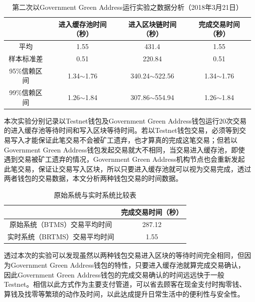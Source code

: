 			\begin{table}[!htbp]
				\centering
				\caption{第二次以Government Green Address运行实验之数据分析（2018年3月21日）}
				\label{2green-1}
				\begin{tabular}{|c|c|c|c|}
				\hline
				         & 进入缓存池时间（秒）     & 进入区块链时间（秒）         & 完成交易时间（秒）      \\ \hline
				平均       & 1.55           & 431.4              & 1.55           \\ \hline
				样本标准差    & 0.51           & 220.84             & 0.51           \\ \hline
				95\%信赖区间 & 1.34$\sim$1.76 & 340.24$\sim$522.56 & 1.34$\sim$1.76 \\ \hline
				99\%信赖区间 & 1.26$\sim$1.84 & 307.86$\sim$554.94 & 1.26$\sim$1.84 \\ \hline
				\end{tabular}
				\end{table}

				

				
				



	本次实验分别记录以Testnet钱包及Government Green Address钱包运行20次交易的进入缓存池等待时间和写入区块等待时间。若以Testnet钱包交易，必须等到交易写入才能保证此笔交易不会被矿工遗弃，也才算真的完成这笔交易；但若以Government Green Address钱包发起交易就大不相同，当交易进入缓存池，即使遇到交易被矿工遗弃的情况，Government Green Address机构节点也会重新发起此笔交易，保证让交易写入区块，所以只要进入缓存池就可以视为交易完成，透过两者钱包的交易数据，本文分析两种钱包交易的时间数据。

	\begin{table}[!htbp]
	\centering
	\caption{原始系统与实时系统比较表}
	\label{generalvsga}
	\begin{tabular}{|c|c|}
	\hline
	 & 完成交易时间（秒） \\ \hline
	原始系统（BTMS）交易平均时间 & 287.12 \\ \hline
	实时系统（BRTMS）交易平均时间 & 1.55 \\ \hline
	\end{tabular}
	\end{table}

	透过本次的实验可以发现虽然以两种钱包交易进入区块的等待时间完全相同，但因为Government Green Address钱包的特性，只要进入缓存池就算完成交易确认，因此Government Green Address钱包的完成交易确认的时间远远快于一般Testnet。相信以此⽅式作为主要⽀付管道，可以省去顾客在现金⽀付时掏零钱、算钱及找零等繁琐的动作及时间，以此达成提升⽇常⽣活中的便利性与安全性。



		